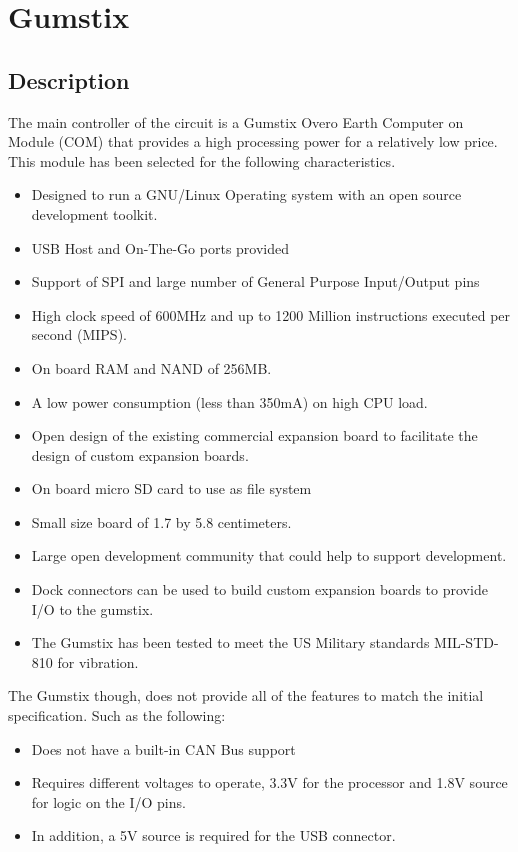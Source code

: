 \documentclass[11pt]{report} %
\begin{document}
	\section{Gumstix}
		\subsection{Description}
		The main controller of the circuit is a Gumstix Overo Earth Computer on
		Module (COM) that provides a high processing power for a relatively
		low price. This module has been selected for the following 
		characteristics.
	
		\begin{itemize}
			\item Designed to run a GNU/Linux Operating system with an open source
			development toolkit.
			\item USB Host and On-The-Go ports provided
			\item Support of SPI and large number of General Purpose Input/Output 
			pins
			\item High clock speed of 600MHz and up to 1200 Million instructions
			executed per second (MIPS).
			\item On board RAM and NAND of 256MB.
			\item A low power consumption (less than 350mA) on high CPU load.
			\item Open design of the existing commercial expansion board to 
			facilitate the design of custom expansion boards.
			\item On board micro SD card to use as file system
			\item Small size board of 1.7 by 5.8 centimeters.
			\item Large open development community that could help to support
					development.
			\item Dock connectors can be used to build custom expansion boards
				to provide I/O to the gumstix.
			\item The Gumstix has been tested to meet the US Military standards
				MIL-STD-810 for vibration.
		\end{itemize}
	
		The Gumstix though, does not provide all of the features to match the initial
		specification. Such as the following:
	
		\begin{itemize}
			\item Does not have a built-in CAN Bus support
			\item Requires different voltages to operate, 3.3V for the 
			processor and 1.8V source for logic on the I/O pins.
			\item In addition, a 5V source is required for the USB connector.
		\end{itemize}
	
\end{document}

